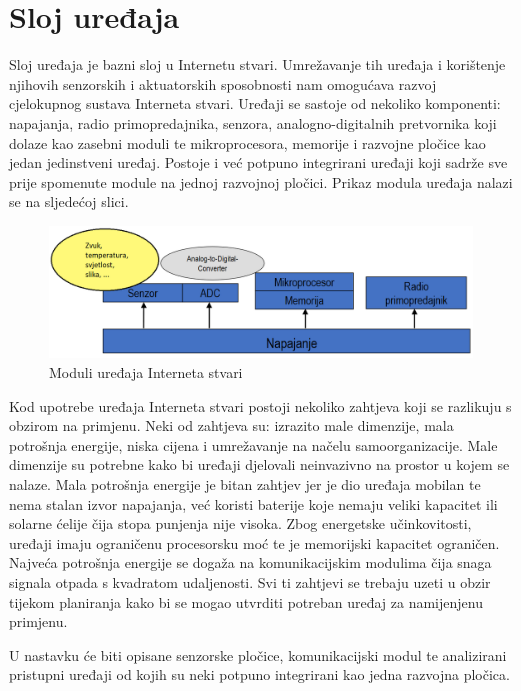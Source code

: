 \documentclass[times, utf8, diplomski]{fer}
\begin{document}
\section{Sloj uređaja}
Sloj uređaja je bazni sloj u Internetu stvari. Umrežavanje tih uređaja i korištenje njihovih senzorskih i aktuatorskih sposobnosti nam omogućava razvoj cjelokupnog sustava Interneta stvari. Uređaji se sastoje od nekoliko komponenti: napajanja, radio primopredajnika, senzora, analogno-digitalnih pretvornika koji dolaze kao zasebni moduli te mikroprocesora, memorije i razvojne pločice kao jedan jedinstveni uređaj. Postoje i već potpuno integrirani uređaji koji sadrže sve prije spomenute module na jednoj razvojnoj pločici. Prikaz modula uređaja nalazi se na sljedećoj slici.
\begin{figure}[htb]
    \centering
    \includegraphics[width=14cm]{images/devicemodule.png}
    \caption{Moduli uređaja Interneta stvari\citep{InternetStvari}}
    \label{fig:devicemodule}
\end{figure}

Kod upotrebe uređaja Interneta stvari postoji nekoliko zahtjeva koji se razlikuju s obzirom na primjenu. Neki od zahtjeva su: izrazito male dimenzije, mala potrošnja energije, niska cijena i umrežavanje na načelu samoorganizacije. Male dimenzije su potrebne kako bi uređaji djelovali neinvazivno na prostor u kojem se nalaze. Mala potrošnja energije je bitan zahtjev jer je dio uređaja mobilan te nema stalan izvor napajanja, već koristi baterije koje nemaju veliki kapacitet ili solarne ćelije čija stopa punjenja nije visoka. Zbog energetske učinkovitosti, uređaji imaju ograničenu procesorsku moć te je memorijski kapacitet ograničen. Najveća potrošnja energije se dogaža na komunikacijskim modulima čija snaga signala otpada s kvadratom udaljenosti. Svi ti zahtjevi se trebaju uzeti u obzir tijekom planiranja kako bi se mogao utvrditi potreban uređaj za namijenjenu primjenu.

U nastavku će biti opisane senzorske pločice, komunikacijski modul te analizirani pristupni uređaji od kojih su neki potpuno integrirani kao jedna razvojna pločica.
\end{document}
